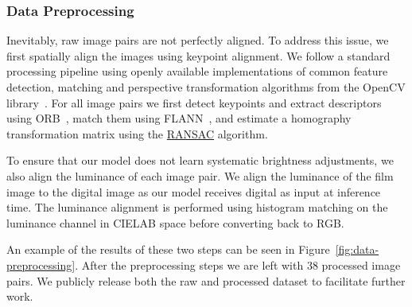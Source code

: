 \subsubsection*{Data Preprocessing}
\label{subsubsec:preprocessing}

Inevitably, raw image pairs are not perfectly aligned. To address this
issue, we first spatially align the images using keypoint alignment. We follow a standard processing pipeline using openly available implementations of common feature detection, matching and perspective transformation algorithms from the OpenCV library~\cite{opencv}. For all image pairs we first detect keypoints and extract descriptors using ORB~\cite{orb}, match them using FLANN~\cite{flann}, and estimate a homography transformation matrix using the \href{https://www.mathworks.com/discovery/ransac.html}{RANSAC} algorithm.

To ensure that our model does not learn systematic brightness adjustments, we also align the luminance of each image pair. We align the luminance of the film image to the digital image as our model receives digital as input at inference time. The luminance alignment is performed using histogram matching on the luminance channel in CIELAB space before converting back to RGB.


An example of the results of these two steps can be seen in Figure~\ref{fig:data-preprocessing}. After the
preprocessing steps we are left with 38 processed image pairs. We publicly
release both the raw and processed dataset to facilitate further work.

